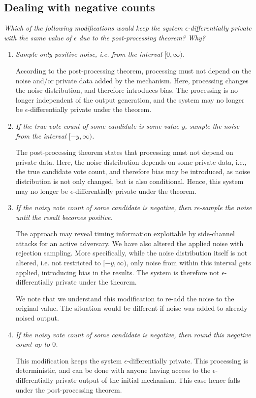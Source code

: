 \documentclass[parskip=half]{scrartcl}
\begin{document}
\subsection{Dealing with negative counts}

\textit{Which of the following modifications would keep the system
$\epsilon$-differentially private with the same value of $\epsilon$ due to the
post-processing theorem? Why?}

\begin{enumerate}
    \item \textit{Sample only positive noise, i.e. from the interval
    $[0, \infty)$.}

    According to the post-processing theorem, processing must not depend on the
    noise and/or private data added by the mechanism. Here, processing changes
    the noise distribution, and therefore introduces bias. The processing is no
    longer independent of the output generation, and the system may no longer
    be $\epsilon$-differentially private under the theorem.

    \item \textit{If the true vote count of some candidate is some value $y$,
    sample the noise from the interval $[-y, \infty)$.}

    The post-processing theorem states that processing must not depend
    on private data. Here, the noise distribution depends on some private data,
    i.e., the true candidate vote count, and therefore bias may be introduced,
    as noise distribution is not only changed, but is also conditional. Hence,
    this system may no longer be $\epsilon$-differentially private under the
    theorem.

    \item \textit{If the noisy vote count of some candidate is negative, then
    re-sample the noise until the result becomes positive.}
    
    The approach may reveal timing information exploitable by side-channel
    attacks for an active adversary. We have also altered the applied noise
    with rejection sampling. More specifically, while the noise distribution
    itself is not altered, i.e. not restricted to $[-y, \infty)$, only noise
    from within this interval gets applied, introducing bias in the results.
    The system is therefore not $\epsilon$-differentially private under the
    theorem.

    We note that we understand this modification to re-add the noise to the
    original value. The situation would be different if noise was added to
    already noised output.

    \item \textit{If the noisy vote count of some candidate is negative, then
    round this negative count up to $0$.}

    This modification keeps the system $\epsilon$-differentially private. This
    processing is deterministic, and can be done with anyone having access to
    the $\epsilon$-differentially private output of the initial mechanism. This
    case hence falls under the post-processing theorem.
\end{enumerate}
\end{document}
